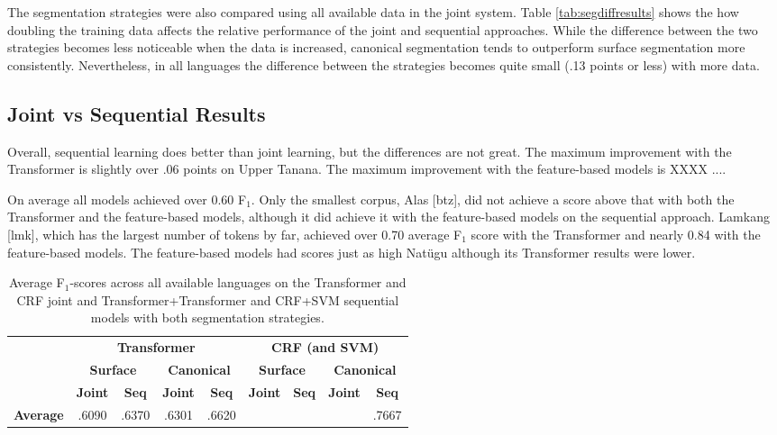 The segmentation strategies were also compared using all available data in the joint system. Table \ref{tab:segdiffresults} shows the how doubling the training data affects the relative performance of the joint and sequential approaches. 
While the difference between the two strategies becomes less noticeable when the data is increased, canonical segmentation tends to outperform surface segmentation more consistently. Nevertheless, in all languages the difference between the strategies becomes quite small (.13 points or less) with more data. 

\subsection{Joint vs Sequential Results}

Overall, sequential learning does better than joint learning, but the differences are not great. The maximum improvement with the Transformer is slightly over .06 points on Upper Tanana.
The maximum improvement with the feature-based models is XXXX ....

On average all models achieved over 0.60 F$_1$. Only the smallest corpus, Alas [btz], did not achieve a score above that with both the Transformer and the feature-based models, although it did achieve it with the feature-based models on the sequential approach. Lamkang [lmk], which has the largest number of tokens by far, achieved over 0.70 average F$_1$ score with the Transformer and nearly 0.84 with the feature-based models. The feature-based models had scores just as high Nat\"ugu although its Transformer results were lower.

\begin{table}[!tb]
    \centering
    \begin{tabular}{l|cc|cc|cc|cc}
          & \multicolumn{4}{c|}{\textbf{Transformer}} & \multicolumn{4}{c}{\textbf{CRF (and SVM)}} 
          \\
          & \multicolumn{2}{c|}{\textbf{Surface}} & \multicolumn{2}{c|}{\textbf{Canonical}}  & \multicolumn{2}{c|}{\textbf{Surface}} & \multicolumn{2}{c}{\textbf{Canonical}} 
          \\
          &  \textbf{Joint} & \textbf{Seq} &  \textbf{Joint} & \textbf{Seq} &  \textbf{Joint} & \textbf{Seq} &  \textbf{Joint} & \textbf{Seq} \\
         \hline
         \textbf{Average} & .6090 & .6370 & .6301 & .6620 
                 &  &  &  & .7667 \\
    \end{tabular}
    \caption[Average Results of All Joint and Sequential models]{Average F$_1$-scores across all available languages on the Transformer and CRF joint and Transformer+Transformer and CRF+SVM sequential models with both segmentation strategies.}
    \label{tab:allsgresults}
\end{table}

